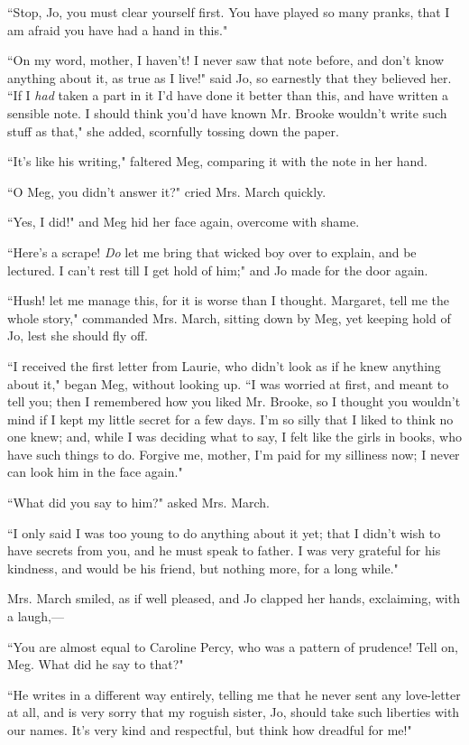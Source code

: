 ``Stop, Jo, you must clear yourself first. You have played so many
pranks, that I am afraid you have had a hand in this."

``On my word, mother, I haven't! I never saw that note
before, and don't know anything about it, as true as I
live!" said Jo, so earnestly that they believed her. ``If I \emph{had}
taken a part in it I'd have done it better than this,
and have written a sensible note. I should think you'd
have known Mr. Brooke wouldn't write such stuff as
that," she added, scornfully tossing down the paper.

``It's like his writing," faltered Meg, comparing it with
the note in her hand.

``O Meg, you didn't answer it?" cried Mrs. March quickly.

``Yes, I did!" and Meg hid her face again, overcome with shame.

``Here's a scrape! \emph{Do} let me bring that wicked boy
over to explain, and be lectured. I can't rest till I
get hold of him;" and Jo made for the door again.

``Hush! let me manage this, for it is worse than I thought. Margaret,
tell me the whole story," commanded Mrs. March, sitting down by Meg, yet
keeping hold of Jo, lest she should fly off.

``I received the first letter from Laurie, who didn't
look as if he knew anything about it," began Meg, without looking up. ``I
was worried at first, and meant to tell you; then I remembered how you
liked Mr. Brooke, so I thought you wouldn't mind if I
kept my little secret for a few days. I'm so silly that
I liked to think no one knew; and, while I was deciding what to say, I
felt like the girls in books, who have such things to do. Forgive me,
mother, I'm paid for my silliness now; I never can look
him in the face again."

``What did you say to him?" asked Mrs. March.

``I only said I was too young to do anything about it yet; that I
didn't wish to have secrets from you, and he must speak
to father. I was very grateful for his kindness, and would be his
friend, but nothing more, for a long while."

Mrs. March smiled, as if well pleased, and Jo clapped her hands,
exclaiming, with a laugh,---

``You are almost equal to Caroline Percy, who was a pattern of prudence!
Tell on, Meg. What did he say to that?"

``He writes in a different way entirely, telling me that he never sent
any love-letter at all, and is very sorry that my roguish sister, Jo,
should take such liberties with our names. It's very
kind and respectful, but think how dreadful for me!"

